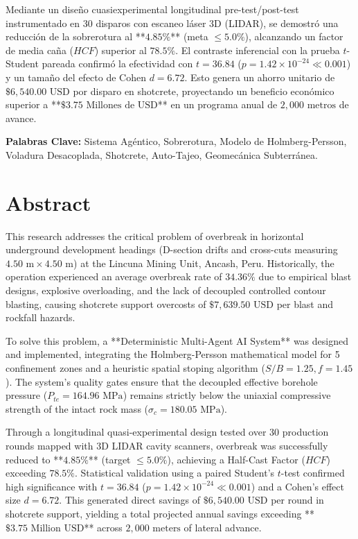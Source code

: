 \documentclass[12pt,a4paper,oneside]{book}
\begin{document}
Mediante un diseño cuasiexperimental longitudinal pre-test/post-test instrumentado en 30 disparos con escaneo láser 3D (LIDAR), se demostró una reducción de la sobrerotura al **$4.85\%$** (meta $\le 5.0\%$), alcanzando un factor de media caña ($HCF$) superior al $78.5\%$. El contraste inferencial con la prueba $t$-Student pareada confirmó la efectividad con $t = 36.84$ ($p = 1.42 \times 10^{-24} \ll 0.001$) y un tamaño del efecto de Cohen $d = 6.72$. Esto genera un ahorro unitario de $\$6,540.00\text{ USD}$ por disparo en shotcrete, proyectando un beneficio económico superior a **$\$3.75\text{ Millones de USD}$** en un programa anual de $2,000\text{ metros}$ de avance.

\textbf{Palabras Clave:} Sistema Agéntico, Sobrerotura, Modelo de Holmberg-Persson, Voladura Desacoplada, Shotcrete, Auto-Tajeo, Geomecánica Subterránea.

\chapter*{Abstract}
This research addresses the critical problem of overbreak in horizontal underground development headings (D-section drifts and cross-cuts measuring $4.50\text{ m} \times 4.50\text{ m}$) at the Lincuna Mining Unit, Ancash, Peru. Historically, the operation experienced an average overbreak rate of $34.36\%$ due to empirical blast designs, explosive overloading, and the lack of decoupled controlled contour blasting, causing shotcrete support overcosts of $\$7,639.50\text{ USD}$ per blast and rockfall hazards.

To solve this problem, a **Deterministic Multi-Agent AI System** was designed and implemented, integrating the Holmberg-Persson mathematical model for 5 confinement zones and a heuristic spatial stoping algorithm ($S/B = 1.25, f = 1.45$). The system's quality gates ensure that the decoupled effective borehole pressure ($P_{te} = 164.96\text{ MPa}$) remains strictly below the uniaxial compressive strength of the intact rock mass ($\sigma_c = 180.05\text{ MPa}$).

Through a longitudinal quasi-experimental design tested over 30 production rounds mapped with 3D LIDAR cavity scanners, overbreak was successfully reduced to **$4.85\%$** (target $\le 5.0\%$), achieving a Half-Cast Factor ($HCF$) exceeding $78.5\%$. Statistical validation using a paired Student's $t$-test confirmed high significance with $t = 36.84$ ($p = 1.42 \times 10^{-24} \ll 0.001$) and a Cohen's effect size $d = 6.72$. This generated direct savings of $\$6,540.00\text{ USD}$ per round in shotcrete support, yielding a total projected annual savings exceeding **$\$3.75\text{ Million USD}$** across $2,000\text{ meters}$ of lateral advance.
\end{document}
